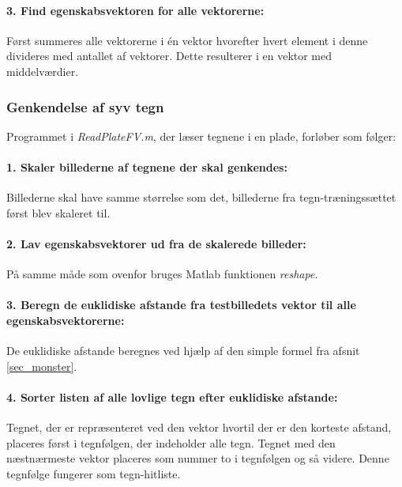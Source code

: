\paragraph{3. Find egenskabsvektoren for alle vektorerne:} Først summeres alle vektorerne i én vektor hvorefter hvert element i denne divideres med antallet af vektorer. Dette resulterer i en vektor med middelværdier.



\subsubsection*{Genkendelse af syv tegn}

Programmet i \textit{ReadPlateFV.m}, der læser tegnene i en plade, forløber som følger:

\paragraph{1. Skaler billederne af tegnene der skal genkendes:} Billederne skal have samme størrelse som det, billederne fra tegn-træningssættet først blev skaleret til.

\paragraph{2. Lav egenskabsvektorer ud fra de skalerede billeder:} På samme måde som ovenfor bruges Matlab funktionen \textit{reshape}.

\paragraph{3. Beregn de euklidiske afstande fra testbilledets vektor til alle egenskabsvektorerne:} De euklidiske afstande beregnes ved hjælp af den simple formel fra afsnit \vref{sec_monster}.


\paragraph{4. Sorter listen af alle lovlige tegn efter euklidiske afstande:} Tegnet, der er repræsenteret ved den vektor hvortil der er den korteste afstand, placeres først i tegnfølgen, der indeholder alle tegn. Tegnet med den næstnærmeste vektor placeres som nummer to i tegnfølgen og så videre. Denne tegnfølge fungerer som tegn-hitliste.


